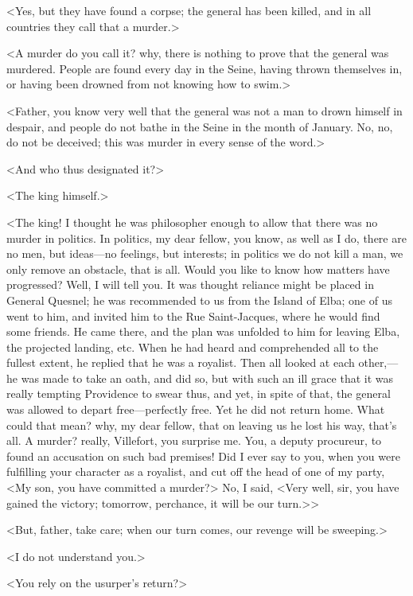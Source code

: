  <Yes, but they have found a corpse; the general has been killed, and in all countries they call that a murder.> 

 <A murder do you call it? why, there is nothing to prove that the general was murdered. People are found every day in the Seine, having thrown themselves in, or having been drowned from not knowing how to swim.> 

 <Father, you know very well that the general was not a man to drown himself in despair, and people do not bathe in the Seine in the month of January. No, no, do not be deceived; this was murder in every sense of the word.> 

 <And who thus designated it?> 

 <The king himself.> 

 <The king! I thought he was philosopher enough to allow that there was no murder in politics. In politics, my dear fellow, you know, as well as I do, there are no men, but ideas—no feelings, but interests; in politics we do not kill a man, we only remove an obstacle, that is all. Would you like to know how matters have progressed? Well, I will tell you. It was thought reliance might be placed in General Quesnel; he was recommended to us from the Island of Elba; one of us went to him, and invited him to the Rue Saint-Jacques, where he would find some friends. He came there, and the plan was unfolded to him for leaving Elba, the projected landing, etc. When he had heard and comprehended all to the fullest extent, he replied that he was a royalist. Then all looked at each other,—he was made to take an oath, and did so, but with such an ill grace that it was really tempting Providence to swear thus, and yet, in spite of that, the general was allowed to depart free—perfectly free. Yet he did not return home. What could that mean? why, my dear fellow, that on leaving us he lost his way, that's all. A murder? really, Villefort, you surprise me. You, a deputy procureur, to found an accusation on such bad premises! Did I ever say to you, when you were fulfilling your character as a royalist, and cut off the head of one of my party, <My son, you have committed a murder?> No, I said, <Very well, sir, you have gained the victory; tomorrow, perchance, it will be our turn.>> 

 <But, father, take care; when our turn comes, our revenge will be sweeping.> 

 <I do not understand you.> 

 <You rely on the usurper's return?> 

